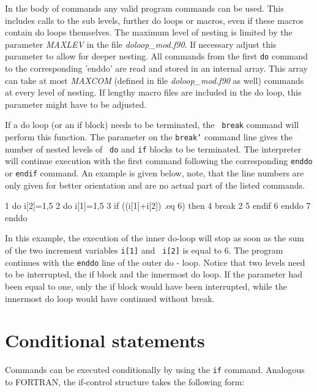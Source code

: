 In the body of commands any valid program commands can be used.
This includes calls to the sub levels, further do loops or macros,
even if these macros contain do loops themselves.  The maximum level
of nesting is limited by the parameter {\it MAXLEV} in the file {\it
doloop\_mod.f90}.  If necessary adjust this parameter to allow for deeper
nesting.  All commands from the first {\tt do} command to the
corresponding 'enddo' are read and stored in an internal array. This
array can take at most {\it MAXCOM} (defined in file {\it
doloop\_mod.f90} as well) commands at every level of nesting.  If lengthy
macro files are included in the do loop, this parameter might have
to be adjusted.  \par

If a do loop (or an if block) needs to be terminated, the {\tt
break} command will perform this function.  The parameter on the
{\tt break'} command line gives the number of nested levels of {\tt
do} and {\tt if} blocks to be terminated. The interpreter will
continue execution with the first command following the
corresponding {\tt enddo} or {\tt endif} command.  An example is
given below, note, that the line numbers are only given for better
orientation and are no actual part of the listed commands. \par

\begin{MacVerbatim}
     1  do i[2]=1,5
     2     do i[1]=1,5
     3        if ((i[1]+i[2]) .eq 6) then
     4           break 2
     5        endif
     6     enddo
     7  enddo
\end{MacVerbatim}

In this example, the execution of the inner do-loop will stop as
soon as the sum of the two increment variables {\tt i[1]} and {\tt
i[2]} is equal to 6.  The program continues with the {\tt enddo}
line of the outer do - loop.  Notice that two levels need to be
interrupted, the if block and the innermost do loop.  If the
parameter had been equal to one, only the if block would have been
interrupted, while the innermost do loop would have continued
without break.\par


\section{Conditional statements \label{if}}

Commands can be executed conditionally by using the {\tt if}
command. Analogous to FORTRAN, the if-control structure takes the
following form:

